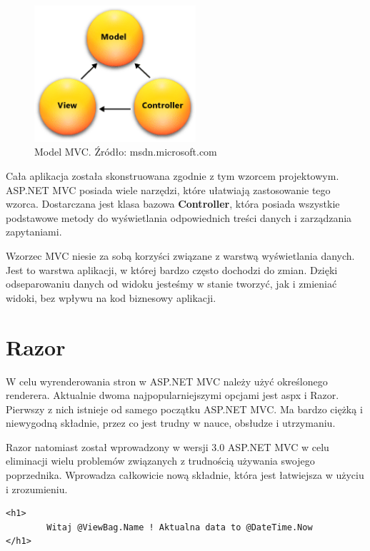 \begin{figure}[h]
	\centering
	\includegraphics[height=50.5mm]{images/mvc.png}
	 \caption{Model MVC. Źródło: msdn.microsoft.com}
\end{figure}

Cała aplikacja została skonstruowana zgodnie z tym wzorcem projektowym. ASP.NET MVC posiada wiele narzędzi, które ułatwiają zastosowanie tego wzorca. Dostarczana jest klasa bazowa \textbf{Controller}, która posiada wszystkie podstawowe metody do wyświetlania odpowiednich treści danych i zarządzania zapytaniami.

Wzorzec MVC niesie za sobą korzyści związane z warstwą wyświetlania danych. Jest to warstwa aplikacji, w której bardzo często dochodzi do zmian. Dzięki odseparowaniu danych od widoku jesteśmy w stanie tworzyć, jak i zmieniać widoki, bez wpływu na kod biznesowy aplikacji.

\section{Razor}

W celu wyrenderowania stron w ASP.NET MVC należy użyć określonego renderera.
Aktualnie dwoma najpopularniejszymi opcjami jest aspx i Razor\cite{Razor}.
Pierwszy z nich istnieje od samego początku ASP.NET MVC. Ma bardzo ciężką i niewygodną składnie, przez co jest trudny w nauce, obsłudze i utrzymaniu.

Razor natomiast został wprowadzony w wersji 3.0 ASP.NET MVC w celu eliminacji wielu problemów związanych z trudnością używania swojego poprzednika. Wprowadza całkowicie nową składnie, która jest łatwiejsza w użyciu i zrozumieniu.

\begin{minipage}{\linewidth}
\begin{lstlisting}[frame=single, numbers=none,captionpos=b, 
caption={Przykładowy kod kompatybilny z Razorem.}]
<h1>
        Witaj @ViewBag.Name ! Aktualna data to @DateTime.Now 
</h1>
\end{lstlisting}
\end{minipage}

